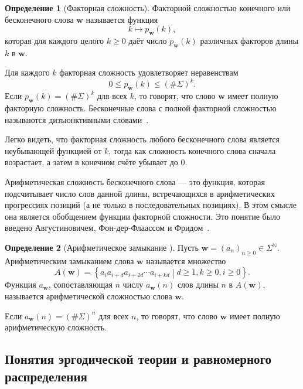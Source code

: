 \documentclass[a4paper,14pt]{extreport}
\theoremstyle{plain}
\theoremstyle{definition}
\newtheorem{definition}{Определение}[section]
\theoremstyle{remark}
\begin{document}
\begin{definition}[Факторная сложность]
	Факторной сложностью конечного или бесконечного слова $\mathbf{w}$ называется функция 
	\begin{equation}
		k \mapsto p_{\mathbf{w}}(k),
	\end{equation}
	которая для каждого целого $k \geq 0$ даёт число $p_{\mathbf{w}}(k)$ различных факторов длины $k$ в $\mathbf{w}$.
\end{definition}

Для каждого $k$ факторная сложность удовлетворяет неравенствам
\begin{equation}
	0 \leq p_{\mathbf{w}}(k) \leq (\#\Sigma)^k.
\end{equation}
Если $p_{\mathbf{w}}(k) = (\#\Sigma)^k$ для всех $k$, то говорят, что слово $\mathbf{w}$ имеет полную факторную сложность. Бесконечные слова с полной факторной сложностью называются дизъюнктивными словами~\cite{Morse}. 

Легко видеть, что факторная сложность любого бесконечного слова является неубывающей функцией от $k$, тогда как сложность конечного слова сначала возрастает, а затем в конечном счёте убывает до $0$. 

Арифметическая сложность бесконечного слова --- это функция, которая подсчитывает число слов данной длины, встречающихся в арифметических прогрессиях позиций (а не только в последовательных позициях). В этом смысле она является обобщением функции факторной сложности. Это понятие было введено Августиновичем, Фон-дер-Флаассом и Фридом~\cite{Avgustinovich}.

\begin{definition}[Арифметическое замыкание {\cite{Duaa23}}]\label{arth01}
	Пусть $\mathbf{w} = (a_{n})_{n \geq 0} \in \Sigma^{\mathbb{N}}$. Арифметическим замыканием слова $\mathbf{w}$ называется множество
	\begin{equation}
		A(\mathbf{w}) = \left\{ a_{i}a_{i+d}a_{i+2d}\cdots a_{i+kd}  \middle|  d \geq 1, k \geq 0, i \geq 0 \right\}.
	\end{equation}
	Функция $a_{\mathbf{w}}$, сопоставляющая $n$ числу $a_{\mathbf{w}}(n)$ слов длины $n$ в $A(\mathbf{w})$, называется арифметической сложностью слова $\mathbf{w}$.
\end{definition}

Если $a_{\mathbf{w}}(n) = (\#\Sigma)^n$ для всех $n$, то говорят, что слово $\mathbf{w}$ имеет полную арифметическую сложность.
\subsection{Понятия эргодической теории и равномерного распределения}~\label{sec2.2.1}
\end{document}
